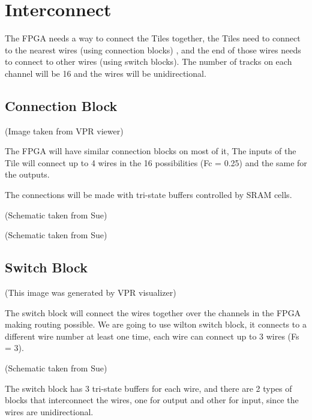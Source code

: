 \documentclass[letterpaper,10pt,english]{sphinxmanual}
\begin{document}
\section{Interconnect}
\label{interconnect:interconnect}\label{interconnect::doc}
The FPGA needs a way to connect the Tiles together, the Tiles need to connect to the nearest wires (using connection blocks) , and the end of those wires needs to connect to other wires (using switch blocks). The number of tracks on each channel will be 16 and the wires will be unidirectional.


\subsection{Connection Block}
\label{connectionblock:connection-block}\label{connectionblock::doc}
\noindent{}

(Image taken from VPR viewer)

The FPGA will have similar connection blocks on most of it, The inputs of the Tile will connect up to 4 wires in the 16 possibilities (Fc = 0.25) and the same for the outputs.

The connections will be made with tri-state buffers controlled by SRAM cells.

\noindent{}

(Schematic taken from Sue)

\noindent{}

(Schematic taken from Sue)


\subsection{Switch Block}
\label{switchblock:switch-block}\label{switchblock::doc}
\noindent{}

(This image was generated by VPR visualizer)

The switch block will connect the wires together over the channels in the FPGA making routing possible. We are going to use wilton switch block, it connects to a different wire number at least one time, each wire can connect up to 3 wires (Fs = 3).

\noindent{}

(Schematic taken from Sue)

The switch block has 3 tri-state buffers for each wire, and there are 2 types of blocks that interconnect the wires, one for output and other for input, since the wires are unidirectional.
\end{document}

